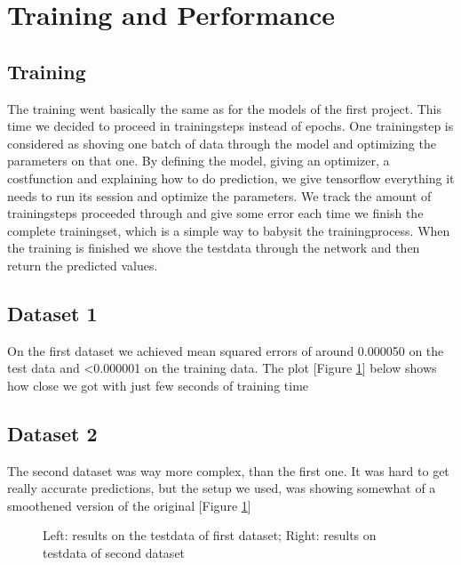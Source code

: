 \documentclass{article}
\begin{document}
\section{Training and Performance}
\subsection{Training}
The training went basically the same as for the models of the first project. This time we decided to proceed in trainingsteps instead of epochs. One trainingstep is considered as shoving one batch of data through the model and optimizing the parameters on that one. By defining the model, giving an optimizer, a costfunction and explaining how to do prediction, we give tensorflow everything it needs to run its session and optimize the parameters. We track the amount of trainingsteps proceeded through and give some error each time we finish the complete trainingset, which is a simple way to babysit the trainingprocess. When the training is finished we shove the testdata through the network and then return the predicted values.
\subsection{Dataset 1}
On the first dataset we achieved mean squared errors of around 0.000050 on the test data and <0.000001 on the training data. The plot [Figure \ref{results}] below shows how close we got with just few seconds of training time
\subsection{Dataset 2}
The second dataset was way more complex, than the first one. It was hard to get really accurate predictions, but the setup we used, was showing somewhat of a smoothened version of the original [Figure \ref{results}]
\begin{figure}[h]
\centering
{}
\caption{Left: results on the testdata of first dataset; Right: results on testdata of second dataset}
\label{results}
\end{figure}
\end{document}
